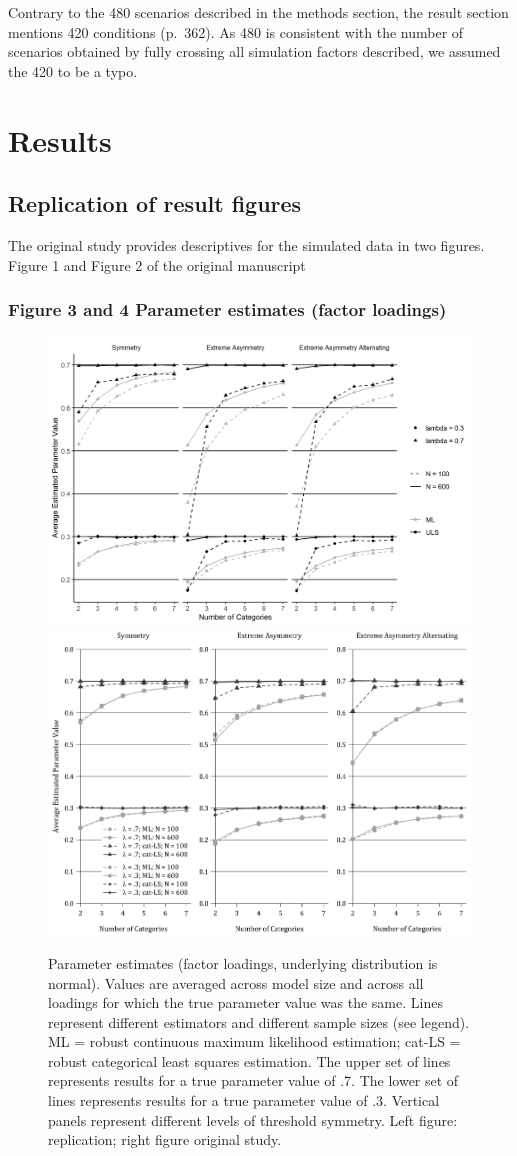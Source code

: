 \documentclass[10,a4paperpaper,]{article}
\begin{document}
Contrary to the 480 scenarios described in the methods section, the
result section mentions 420 conditions (p.~362). As 480 is consistent
with the number of scenarios obtained by fully crossing all simulation
factors described, we assumed the 420 to be a typo.

\section{Results}

\subsection{Replication of result figures}

The original study provides descriptives for the simulated data in two
figures. Figure 1 and Figure 2 of the original manuscript

\subsubsection{Figure 3 and 4 Parameter estimates (factor loadings)}

\begin{figure}
\includegraphics[width=0.49\linewidth]{./figures/fig_3} \includegraphics[width=0.49\linewidth]{./figures/fig3_original} \caption{Parameter estimates (factor loadings, underlying distribution is normal). Values are averaged across model size and across all loadings for which the true parameter value was the same. Lines represent different estimators and different sample sizes (see legend). ML = robust continuous maximum likelihood estimation; cat-LS = robust categorical least squares estimation. The upper set of lines represents results for a true parameter value of .7. The lower set of lines represents results for a true parameter value of .3. Vertical panels represent different levels of threshold symmetry. Left figure: replication; right figure original study.}\label{fig:fig3}
\end{figure}
\end{document}
